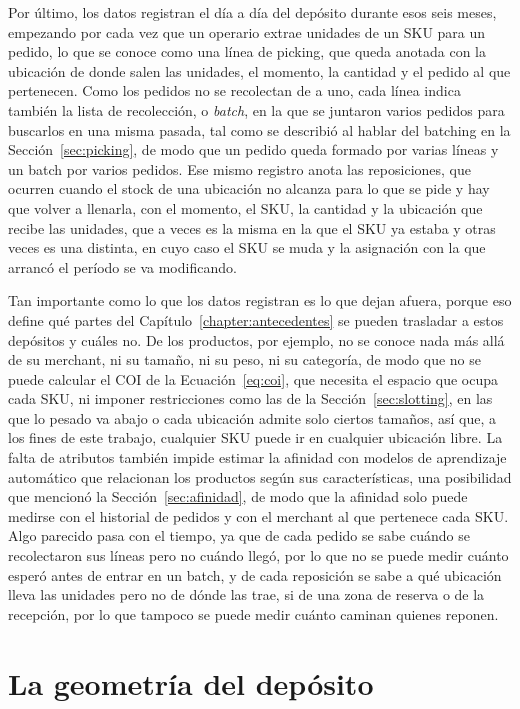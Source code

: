 Por último, los datos registran el día a día del depósito durante esos seis meses, empezando por cada vez que un operario extrae unidades de un SKU para un pedido, lo que se conoce como una línea de picking, que queda anotada con la ubicación de donde salen las unidades, el momento, la cantidad y el pedido al que pertenecen.
Como los pedidos no se recolectan de a uno, cada línea indica también la lista de recolección, o \emph{batch}, en la que se juntaron varios pedidos para buscarlos en una misma pasada, tal como se describió al hablar del batching en la Sección~\ref{sec:picking}, de modo que un pedido queda formado por varias líneas y un batch por varios pedidos.
Ese mismo registro anota las reposiciones, que ocurren cuando el stock de una ubicación no alcanza para lo que se pide y hay que volver a llenarla, con el momento, el SKU, la cantidad y la ubicación que recibe las unidades, que a veces es la misma en la que el SKU ya estaba y otras veces es una distinta, en cuyo caso el SKU se muda y la asignación con la que arrancó el período se va modificando.

Tan importante como lo que los datos registran es lo que dejan afuera, porque eso define qué partes del Capítulo~\ref{chapter:antecedentes} se pueden trasladar a estos depósitos y cuáles no.
De los productos, por ejemplo, no se conoce nada más allá de su merchant, ni su tamaño, ni su peso, ni su categoría, de modo que no se puede calcular el COI de la Ecuación~\ref{eq:coi}, que necesita el espacio que ocupa cada SKU, ni imponer restricciones como las de la Sección~\ref{sec:slotting}, en las que lo pesado va abajo o cada ubicación admite solo ciertos tamaños, así que, a los fines de este trabajo, cualquier SKU puede ir en cualquier ubicación libre.
La falta de atributos también impide estimar la afinidad con modelos de aprendizaje automático que relacionan los productos según sus características, una posibilidad que mencionó la Sección~\ref{sec:afinidad}, de modo que la afinidad solo puede medirse con el historial de pedidos y con el merchant al que pertenece cada SKU.
Algo parecido pasa con el tiempo, ya que de cada pedido se sabe cuándo se recolectaron sus líneas pero no cuándo llegó, por lo que no se puede medir cuánto esperó antes de entrar en un batch, y de cada reposición se sabe a qué ubicación lleva las unidades pero no de dónde las trae, si de una zona de reserva o de la recepción, por lo que tampoco se puede medir cuánto caminan quienes reponen.

\section{La geometría del depósito}
\label{sec:geometria-deposito}

